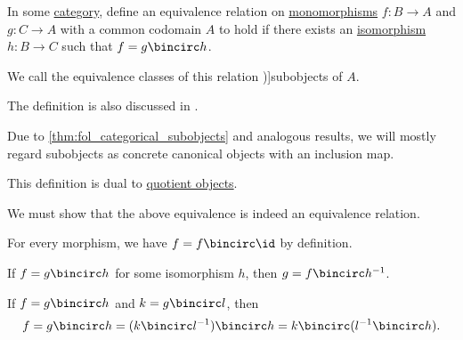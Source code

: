 \begin{definition}\label{def:categorical_subobject}
  In some \hyperref[def:category]{category}, define an equivalence relation on \hyperref[def:morphism_cancellation/left]{monomorphisms} \( f: B \to A \) and \( g: C \to A \) with a common codomain \( A \) to hold if there exists an \hyperref[def:morphism_invertibility/isomorphism]{isomorphism} \( h: B \to C \) such that \( f = g \bincirc h \).

  We call the equivalence classes of this relation \term[ru=подобъект (\cite[24]{ЦаленкоШульгейфер1974ОсновыТеорииКатегорий})]{subobjects} of \( A \).
\end{definition}
\begin{comments}
  \item The definition is also discussed in \cite{MathSE:categorical_subobject_definition}.

  \item Due to \cref{thm:fol_categorical_subobjects} and analogous results, we will mostly regard subobjects as concrete canonical objects with an inclusion map.

  \item This definition is dual to \hyperref[def:categorical_quotient_object]{quotient objects}.
\end{comments}
\begin{defproof}
  We must show that the above equivalence is indeed an equivalence relation.

   For every morphism, we have \( f = f \bincirc \id \) by definition.

   If \( f = g \bincirc h \) for some isomorphism \( h \), then \( g = f \bincirc h^{-1} \).

   If \( f = g \bincirc h \) and \( k = g \bincirc l \), then
  \begin{equation*}
    f = g \bincirc h = (k \bincirc l^{-1}) \bincirc h = k \bincirc (l^{-1} \bincirc h).
  \end{equation*}
\end{defproof}

